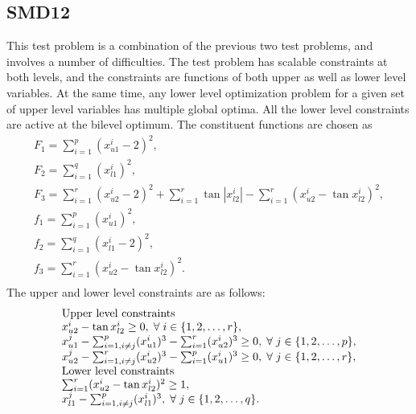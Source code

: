 \documentclass[twoside]{article}
\begin{document}
\subsection{SMD12}
This test problem is a combination of the previous two test problems, and involves a number of difficulties. The test problem has scalable constraints at both levels, and the constraints are functions of both upper as well as lower level variables. At the same time, any lower level optimization problem for a given set of upper level variables has multiple global optima. All the lower level constraints are active at the bilevel optimum. The constituent functions are chosen as
\begin{equation}
\begin{array}{l}
F_1 = \sum_{i=1}^{p} (x_{u1}^{i} - 2)^2,\\
F_2 = \sum_{i=1}^{q} (x_{l1}^{i})^2,\\
F_3 = \sum_{i=1}^{r} (x_{u2}^{i} - 2)^2 + \sum_{i=1}^{r} \tan |x_{l2}^{i}| - \sum_{i=1}^{r} (x_{u2}^{i} - \tan x_{l2}^{i})^2,\\
f_1 = \sum_{i=1}^{p} (x_{u1}^{i})^2,\\
f_2 = \sum_{i=1}^{q} (x_{l1}^{i} - 2)^2,\\
f_3 = \sum_{i=1}^{r} (x_{u2}^{i} - \tan x_{l2}^{i})^2.\\
\end{array}
\end{equation}
The upper and lower level constraints are as follows:
\begin{equation}
\begin{array}{l}
\mbox{Upper level constraints}\\
x_{u2}^{i} - \tan x_{l2}^{i} \ge 0, \hspace{1mm} \forall \hspace{1mm} i \in \{1,2,\ldots,r\},\\
x_{u1}^{j} - \sum_{i=1,i \ne j}^{p} (x_{u1}^{i})^3 - \sum_{i=1}^{r} (x_{u2}^{i})^3  \ge 0, \hspace{1mm} \forall \hspace{1mm} j \in \{1,2,\ldots,p\},\\
x_{u2}^{j} - \sum_{i=1,i \ne j}^{r} (x_{u2}^{i})^3 - \sum_{i=1}^{p} (x_{u1}^{i})^3  \ge 0, \hspace{1mm} \forall \hspace{1mm} j \in \{1,2,\ldots,r\},\\
\mbox{Lower level constraints}\\
\sum_{i=1}^{r} (x_{u2}^{i} - \tan x_{l2}^{i})^2 \ge 1,\\
x_{l1}^{j} - \sum_{i=1,i \ne j}^{p} (x_{l1}^{i})^3, \hspace{1mm} \forall \hspace{1mm} j \in \{1,2,\ldots,q\}.\\
\end{array}
\end{equation}
\end{document}
